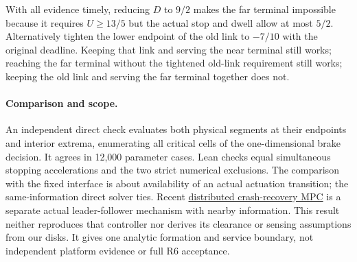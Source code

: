\documentclass{article}
\begin{document}
With all evidence timely, reducing \(D\) to \(9/2\) makes the far terminal impossible because it requires \(U\ge13/5\) but the actual stop and dwell allow at most \(5/2\). Alternatively tighten the lower endpoint of the old link to \(-7/10\) with the original deadline. Keeping that link and serving the near terminal still works; reaching the far terminal without the tightened old-link requirement still works; keeping the old link and serving the far terminal together does not.

\paragraph{Comparison and scope.}
An independent direct check evaluates both physical segments at their endpoints and interior extrema, enumerating all critical cells of the one-dimensional brake decision. It agrees in 12,000 parameter cases. Lean checks equal simultaneous stopping accelerations and the two strict numerical exclusions. The comparison with the fixed interface is about availability of an actual actuation transition; the same-information direct solver ties. Recent \href{https://en.endo-lab.jp/publication/detail/12147}{distributed crash-recovery MPC} is a separate actual leader-follower mechanism with nearby information. This result neither reproduces that controller nor derives its clearance or sensing assumptions from our disks. It gives one analytic formation and service boundary, not independent platform evidence or full R6 acceptance.
\end{document}
